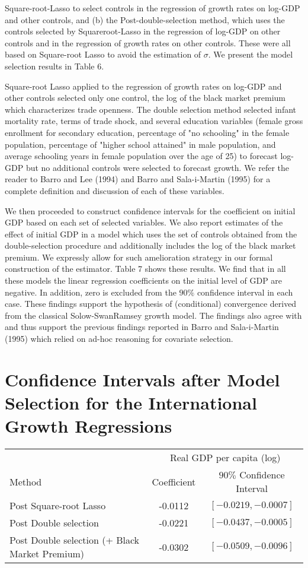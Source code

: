 \documentclass[10pt]{article}
\begin{document}
Square-root-Lasso to select controls in the regression of growth rates on log-GDP and other controls, and (b) the Post-double-selection method, which uses the controls selected by Squareroot-Lasso in the regression of log-GDP on other controls and in the regression of growth rates on other controls. These were all based on Square-root Lasso to avoid the estimation of \(\sigma\). We present the model selection results in Table 6.

Square-root Lasso applied to the regression of growth rates on log-GDP and other controls selected only one control, the log of the black market premium which characterizes trade openness. The double selection method selected infant mortality rate, terms of trade shock, and several education variables (female gross enrollment for secondary education, percentage of "no schooling" in the female population, percentage of "higher school attained" in male population, and average schooling years in female population over the age of 25) to forecast log-GDP but no additional controls were selected to forecast growth. We refer the reader to Barro and Lee (1994) and Barro and Sala-i-Martin (1995) for a complete definition and discussion of each of these variables.

We then proceeded to construct confidence intervals for the coefficient on initial GDP based on each set of selected variables. We also report estimates of the effect of initial GDP in a model which uses the set of controls obtained from the double-selection procedure and additionally includes the log of the black market premium. We expressly allow for such amelioration strategy in our formal construction of the estimator. Table 7 shows these results. We find that in all these models the linear regression coefficients on the initial level of GDP are negative. In addition, zero is excluded from the \(90 \%\) confidence interval in each case. These findings support the hypothesis of (conditional) convergence derived from the classical Solow-SwanRamsey growth model. The findings also agree with and thus support the previous findings reported in Barro and Sala-i-Martin (1995) which relied on ad-hoc reasoning for covariate selection.

\section*{Confidence Intervals after Model Selection for the International Growth Regressions}
\begin{center}
\begin{tabular}{lcc}
\hline
 & \multicolumn{2}{c}{Real GDP per capita (log)} \\
Method & Coefficient & \(90 \%\) Confidence Interval \\
\hline
Post Square-root Lasso & -0.0112 & \([-0.0219,-0.0007]\) \\
Post Double selection & -0.0221 & \([-0.0437,-0.0005]\) \\
Post Double selection (+ Black Market Premium) & -0.0302 & \([-0.0509,-0.0096]\) \\
\hline
\end{tabular}
\end{center}
\end{document}
